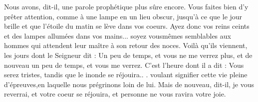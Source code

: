  Nous avons, dit-il, une parole prophétique plus sûre encore. Vous faites bien d'y prêter attention, comme à une lampe en un lieu obscur, jusqu'à ce que le jour brille et que l'étoile du matin se lève dans vos coeurs. Ayez donc vos reins ceints et des lampes allumées dans vos mains... soyez vousmêmes semblables aux hommes qui attendent leur maître à son retour des noces. Voilà qu’ils viennent, les jours dont le Seigneur dit : Un peu de temps, et vous ne me verrez plus, et de nouveau un peu de temps, et vous me verrez. C’est l’heure dont il a dit : Vous serez tristes, tandis que le inonde se réjouira.. . voulant signifier cette vie pleine d’épreuves,en laquelle nous prégrinons loin de lui. Mais de nouveau, dit-il, je vous reverrai, et votre coeur se réjouira, et personne ne vous ravira votre joie.